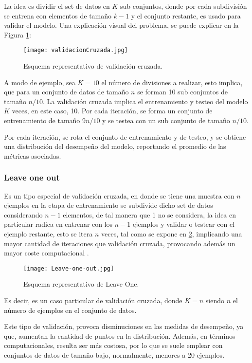 La idea es dividir el set de datos en $K$ sub conjuntos, donde por cada subdivisión se entrena con elementos de tamaño $k-1$ y el conjunto restante, es usado para validar el modelo. Una explicación visual del problema, se puede explicar en la Figura  \ref{VC}:

\begin{figure}[!h]
	\centering
	\texttt{[image: validacionCruzada.jpg]}
	\caption{Esquema representativo de validación cruzada.}
	\label{VC}
\end{figure}

A modo de ejemplo, sea $K=10$ el número de divisiones a realizar, esto implica, que para un conjunto de datos de tamaño $n$ se forman 10 sub conjuntos de tamaño $n/10$. La validación cruzada implica el entrenamiento y testeo del modelo $K$ veces, en este caso, 10. Por cada iteración, se forma un conjunto de entrenamiento de tamaño $9n/10$ y se testea con un sub conjunto de tamaño $n/10$. 

Por cada iteración, se rota el conjunto de entrenamiento y de testeo, y se obtiene una distribución del desempeño del modelo, reportando el promedio de las métricas asociadas.

\subsubsection{Leave one out}

Es un tipo especial de validación cruzada, en donde se tiene una muestra con $n$ ejemplos en la etapa de entrenamiento se subdivide dicho set de datos considerando $n-1$ elementos, de tal manera que 1 no se considera, la idea en particular radica en entrenar con los $n-1$ ejemplos y validar o testear con el ejemplo restante, esto se itera $n$ veces, tal como se expone en \ref{LOO}, implicando una mayor cantidad de iteraciones que validación cruzada, provocando además un mayor coste computacional \cite{kohavi1995study}.

\begin{figure}[!h]
	\centering
	\texttt{[image: Leave-one-out.jpg]}
	\caption{Esquema representativo de Leave One.}
	\label{LOO}
\end{figure}

Es decir, es un caso particular de validación cruzada, donde $K=n$ siendo $n$ el número de ejemplos en el conjunto de datos.

Este tipo de validación, provoca disminuciones en las medidas de desempeño, ya que, aumentan la cantidad de puntos en la distribución. Además, en términos computacionales, resulta ser más costosa, por lo que se suele emplear con conjuntos de datos de tamaño bajo, normalmente, menores a 20 ejemplos.

